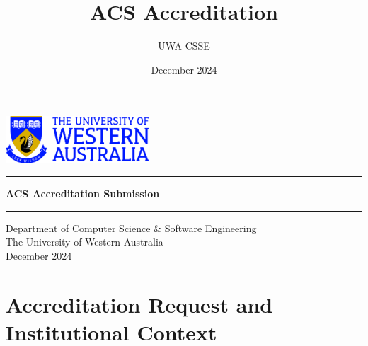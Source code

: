 \documentclass[10pt,a4paper]{report}
\title{ACS Accreditation}
\author{UWA CSSE}
\date{December 2024}
\begin{document}
%

\begin{titlepage}                                             %
\pagestyle{empty}                                             %
\centering                                                    %
\includegraphics[width=0.4\textwidth]{uwa-logo.jpg} \\ %
\vspace{60mm}                                                 %
\hrule\vspace{5mm}                                            %
{\LARGE \textbf{{ACS Accreditation Submission}}} \\           %
\vspace{5mm}\hrule\vspace{20mm}                               %
{\large Department of Computer Science \& Software Engineering} \\ \vspace{2mm}                           %
\vfill                                                        %
{\small The University of Western Australia\\ December 2024}                %
\cleardoublepage                                              %
\end{titlepage}




\tableofcontents

\part{Accreditation Request and Institutional Context}                                                     



\end{document}
